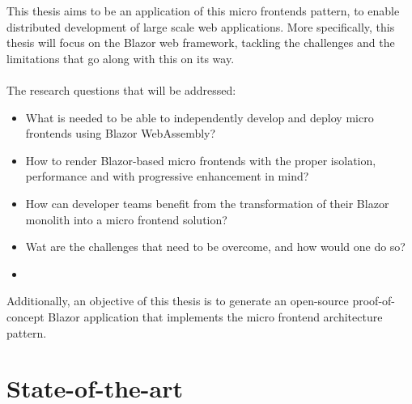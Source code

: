 This thesis aims to be an application of this micro frontends pattern, to enable
distributed development of large scale web applications. More specifically, this
thesis will focus on the Blazor web framework, tackling the challenges and the
limitations that go along with this on its way.\\\\\noindent The research
questions that will be addressed:
\begin{itemize}
    \item What is needed to be able to independently develop and deploy micro
    frontends using Blazor WebAssembly?
    \item How to render Blazor-based micro frontends with the proper isolation,
    performance and with progressive enhancement in mind?
    \item How can developer teams benefit from the transformation of their
    Blazor monolith into a micro frontend solution?
    \item Wat are the challenges that need to be overcome, and how would one do
    so? 
    \item[]
\end{itemize}

\noindent Additionally, an objective of this thesis is to generate an open-source
proof-of-concept Blazor application that implements the micro frontend
architecture pattern.

\section{State-of-the-art}
\label{sec:state-of-the-art}

%
%

